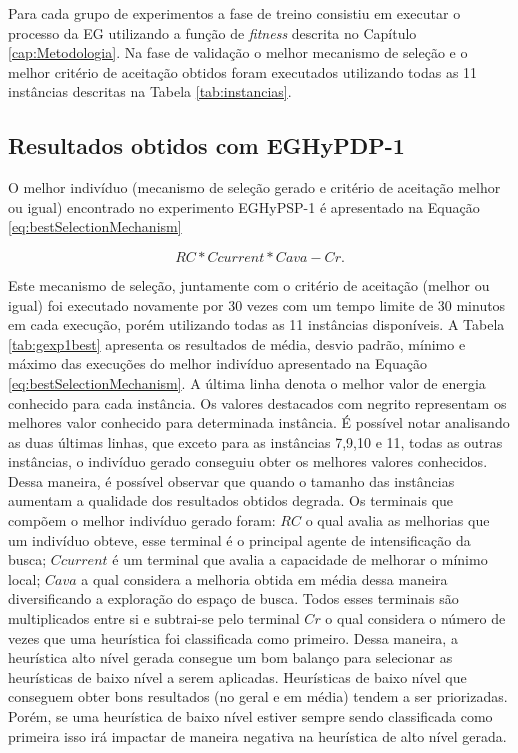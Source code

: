 	Para cada grupo de experimentos a fase de treino consistiu em executar o processo da EG utilizando a função de \textit{fitness} descrita no Capítulo \ref{cap:Metodologia}. Na fase de validação o melhor mecanismo de seleção e o melhor critério de aceitação obtidos foram  executados utilizando todas as 11 instâncias descritas na Tabela \ref{tab:instancias}. 
	

	
	\subsection{Resultados obtidos com EGHyPDP-1}
	\label{subsection:gehypdp1results}
	
	O melhor indivíduo (mecanismo de seleção gerado e critério de aceitação melhor ou igual) encontrado no experimento EGHyPSP-1 é apresentado na Equação \ref{eq:bestSelectionMechanism}
	
	\begin{equation}
	\label{eq:bestSelectionMechanism}
	RC * Ccurrent * Cava -Cr.
	\end{equation}
	

	
	Este mecanismo de seleção, juntamente com o critério de aceitação (melhor ou igual) foi executado novamente por 30 vezes com um tempo limite de 30 minutos em cada execução, porém utilizando todas as 11 instâncias disponíveis. A Tabela  \ref{tab:gexp1best} apresenta os resultados de média, desvio padrão, mínimo e máximo das execuções do melhor indivíduo apresentado na Equação \ref{eq:bestSelectionMechanism}. A última linha denota o melhor valor de energia conhecido para cada instância. Os valores destacados com negrito representam os melhores valor conhecido para determinada instância. É possível notar analisando as duas últimas linhas, que exceto para as instâncias 7,9,10 e 11, todas as outras instâncias, o indivíduo gerado conseguiu obter os melhores valores conhecidos. Dessa maneira, é possível observar que quando o tamanho das instâncias aumentam a qualidade dos resultados obtidos degrada. Os terminais que compõem o melhor indivíduo gerado foram: $RC$ o qual avalia as melhorias que um indivíduo obteve, esse terminal é o principal agente de intensificação da busca; $Ccurrent$ é um terminal que avalia a capacidade de melhorar o mínimo local; $Cava$ a qual considera a melhoria obtida em média dessa maneira diversificando a exploração do espaço de busca. Todos esses terminais são multiplicados entre si e subtrai-se pelo terminal $Cr$ o qual considera o número de vezes que uma heurística foi classificada como primeiro. Dessa maneira, a heurística alto nível gerada consegue um bom balanço para selecionar as heurísticas de baixo nível a serem aplicadas. Heurísticas de baixo nível que conseguem obter bons resultados (no geral e em média) tendem a ser priorizadas. Porém, se uma heurística de baixo nível estiver sempre sendo classificada como primeira isso irá impactar de maneira negativa na heurística de alto nível gerada.
	

